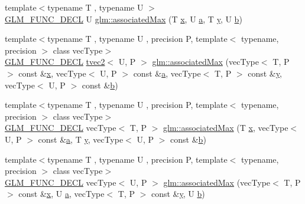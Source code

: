 \begin{DoxyCompactItemize}
\item 
{\footnotesize template$<$typename T , typename U $>$ }\\\mbox{\hyperlink{setup_8hpp_ab2d052de21a70539923e9bcbf6e83a51}{G\+L\+M\+\_\+\+F\+U\+N\+C\+\_\+\+D\+E\+CL}} U \mbox{\hyperlink{group__gtx__associated__min__max_ga7d9c8785230c8db60f72ec8975f1ba45}{glm\+::associated\+Max}} (T \mbox{\hyperlink{glad_8h_a92d0386e5c19fb81ea88c9f99644ab1d}{x}}, U \mbox{\hyperlink{glad_8h_ac8729153468b5dcf13f971b21d84d4e5}{a}}, T \mbox{\hyperlink{glad_8h_a66ddd433d2cacfe27f5906b7e86faeed}{y}}, U \mbox{\hyperlink{glad_8h_a6eba317e3cf44d6d26c04a5a8f197dcb}{b}})
\item 
{\footnotesize template$<$typename T , typename U , precision P, template$<$ typename, precision $>$ class vec\+Type$>$ }\\\mbox{\hyperlink{setup_8hpp_ab2d052de21a70539923e9bcbf6e83a51}{G\+L\+M\+\_\+\+F\+U\+N\+C\+\_\+\+D\+E\+CL}} \mbox{\hyperlink{structglm_1_1tvec2}{tvec2}}$<$ U, P $>$ \mbox{\hyperlink{group__gtx__associated__min__max_ga10ba6001798f42a0f941f19ff30e066a}{glm\+::associated\+Max}} (vec\+Type$<$ T, P $>$ const \&\mbox{\hyperlink{glad_8h_a92d0386e5c19fb81ea88c9f99644ab1d}{x}}, vec\+Type$<$ U, P $>$ const \&\mbox{\hyperlink{glad_8h_ac8729153468b5dcf13f971b21d84d4e5}{a}}, vec\+Type$<$ T, P $>$ const \&\mbox{\hyperlink{glad_8h_a66ddd433d2cacfe27f5906b7e86faeed}{y}}, vec\+Type$<$ U, P $>$ const \&\mbox{\hyperlink{glad_8h_a6eba317e3cf44d6d26c04a5a8f197dcb}{b}})
\item 
{\footnotesize template$<$typename T , typename U , precision P, template$<$ typename, precision $>$ class vec\+Type$>$ }\\\mbox{\hyperlink{setup_8hpp_ab2d052de21a70539923e9bcbf6e83a51}{G\+L\+M\+\_\+\+F\+U\+N\+C\+\_\+\+D\+E\+CL}} vec\+Type$<$ T, P $>$ \mbox{\hyperlink{group__gtx__associated__min__max_ga62ca63cca6b21387b8a25474f441a869}{glm\+::associated\+Max}} (T \mbox{\hyperlink{glad_8h_a92d0386e5c19fb81ea88c9f99644ab1d}{x}}, vec\+Type$<$ U, P $>$ const \&\mbox{\hyperlink{glad_8h_ac8729153468b5dcf13f971b21d84d4e5}{a}}, T \mbox{\hyperlink{glad_8h_a66ddd433d2cacfe27f5906b7e86faeed}{y}}, vec\+Type$<$ U, P $>$ const \&\mbox{\hyperlink{glad_8h_a6eba317e3cf44d6d26c04a5a8f197dcb}{b}})
\item 
{\footnotesize template$<$typename T , typename U , precision P, template$<$ typename, precision $>$ class vec\+Type$>$ }\\\mbox{\hyperlink{setup_8hpp_ab2d052de21a70539923e9bcbf6e83a51}{G\+L\+M\+\_\+\+F\+U\+N\+C\+\_\+\+D\+E\+CL}} vec\+Type$<$ U, P $>$ \mbox{\hyperlink{group__gtx__associated__min__max_ga5364520173815b66a9d9e452c38bf312}{glm\+::associated\+Max}} (vec\+Type$<$ T, P $>$ const \&\mbox{\hyperlink{glad_8h_a92d0386e5c19fb81ea88c9f99644ab1d}{x}}, U \mbox{\hyperlink{glad_8h_ac8729153468b5dcf13f971b21d84d4e5}{a}}, vec\+Type$<$ T, P $>$ const \&\mbox{\hyperlink{glad_8h_a66ddd433d2cacfe27f5906b7e86faeed}{y}}, U \mbox{\hyperlink{glad_8h_a6eba317e3cf44d6d26c04a5a8f197dcb}{b}})

\end{DoxyCompactItemize}
